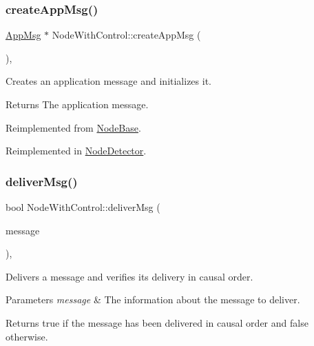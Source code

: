 \subsubsection{\texorpdfstring{create\+App\+Msg()}{createAppMsg()}}
{\footnotesize\ttfamily \hyperlink{class_app_msg}{App\+Msg} $\ast$ Node\+With\+Control\+::create\+App\+Msg (\begin{DoxyParamCaption}{ }\end{DoxyParamCaption})\hspace{0.3cm}{\ttfamily [protected]}, {\ttfamily [virtual]}}



Creates an application message and initializes it. 

\begin{DoxyReturn}{Returns}
The application message. 
\end{DoxyReturn}


Reimplemented from \hyperlink{class_node_base_ac8b9e21b1cc32fd86aaa6c956b93a7c3}{Node\+Base}.



Reimplemented in \hyperlink{class_node_detector_a7100349647350ad5e3aeb1ed4669c723}{Node\+Detector}.

\mbox{\label{class_node_with_control_aada7451be61be592b27188b6249afef2}} 
\subsubsection{\texorpdfstring{deliver\+Msg()}{deliverMsg()}}
{\footnotesize\ttfamily bool Node\+With\+Control\+::deliver\+Msg (\begin{DoxyParamCaption}\item[{const \hyperlink{structures_8h_a7e7bdc1d2fff8a9436f2f352b2711ed6}{message\+Info} \&}]{message }\end{DoxyParamCaption})\hspace{0.3cm}{\ttfamily [protected]}, {\ttfamily [virtual]}}



Delivers a message and verifies its delivery in causal order. 


\begin{DoxyParams}{Parameters}
{\em message} & The information about the message to deliver. \\
\hline
\end{DoxyParams}
\begin{DoxyReturn}{Returns}
true if the message has been delivered in causal order and false otherwise. 
\end{DoxyReturn}


